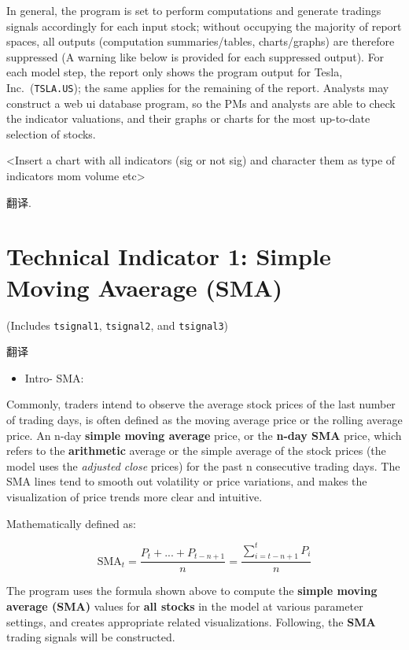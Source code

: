 \documentclass[
]{book}
\providecommand{\tightlist}{%
  \setlength{\itemsep}{0pt}\setlength{\parskip}{0pt}}
\begin{document}
In general, the program is set to perform computations and generate
tradings signals accordingly for each input stock; without occupying the
majority of report spaces, all outputs (computation summaries/tables,
charts/graphs) are therefore suppressed (A warning like below is
provided for each suppressed output). For each model step, the report
only shows the program output for Tesla, Inc.~(\texttt{TSLA.US}); the
same applies for the remaining of the report. Analysts may construct a
web ui database program, so the PMs and analysts are able to check the
indicator valuations, and their graphs or charts for the most up-to-date
selection of stocks.

\textless Insert a chart with all indicators (sig or not sig) and
character them as type of indicators mom volume etc\textgreater{}

翻译.

\hypertarget{technical-indicator-1-simple-moving-avaerage-sma}{%
\section{Technical Indicator 1: Simple Moving Avaerage
(SMA)}\label{technical-indicator-1-simple-moving-avaerage-sma}}

(Includes \texttt{tsignal1}, \texttt{tsignal2}, and \texttt{tsignal3})

翻译

\begin{itemize}
\tightlist
\item
  Intro- SMA:
\end{itemize}

Commonly, traders intend to observe the average stock prices of the last
number of trading days, is often defined as the moving average price or
the rolling average price. An n-day \textbf{simple moving average}
price, or the \textbf{n-day SMA} price, which refers to the
\textbf{arithmetic} average or the simple average of the stock prices
(the model uses the \emph{adjusted close} prices) for the past n
consecutive trading days. The SMA lines tend to smooth out volatility or
price variations, and makes the visualization of price trends more clear
and intuitive.

Mathematically defined as:

\[\text{SMA}_t=\frac{P_t+...+P_{t-n+1}}{n}=\frac{\sum^{t}_{i=t-n+1}P_i}{n}\]

The program uses the formula shown above to compute the \textbf{simple
moving average (SMA)} values for \textbf{all stocks} in the model at
various parameter settings, and creates appropriate related
visualizations. Following, the \textbf{SMA} trading signals will be
constructed.
\end{document}
